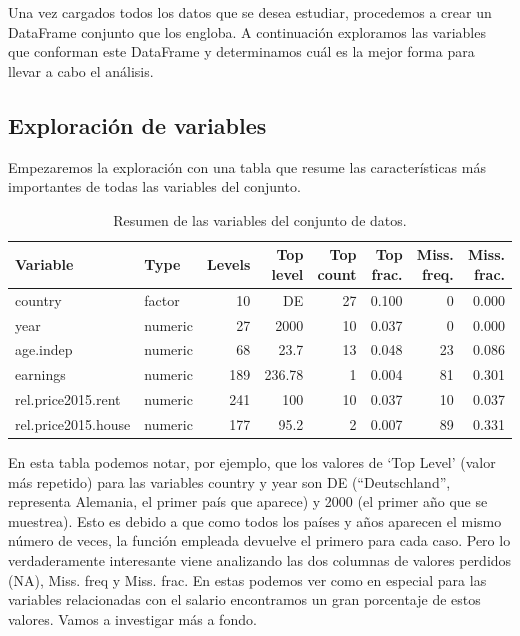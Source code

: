 \documentclass[water,article,submit,pdftex,moreauthors]{Definitions/mdpi}
\begin{document}
Una vez cargados todos los datos que se desea estudiar, procedemos a
crear un DataFrame conjunto que los engloba. A continuación exploramos
las variables que conforman este DataFrame y determinamos cuál es la
mejor forma para llevar a cabo el análisis.

\subsection{Exploración de variables}\label{exploraciuxf3n-de-variables}

Empezaremos la exploración con una tabla que resume las características
más importantes de todas las variables del conjunto.

\begin{table}[H]
\caption{Resumen de las variables del conjunto de datos.}
\centering\footnotesize\setlength{\tabcolsep}{4pt}

\begin{tabular}{llrrrrrr}
\toprule
Variable & Type & Levels & Top level & Top count & Top frac. & Miss. freq. & Miss. frac.\\
\midrule
country & factor & 10 & DE & 27 & 0.100 & 0 & 0.000\\
year & numeric & 27 & 2000 & 10 & 0.037 & 0 & 0.000\\
age.indep & numeric & 68 & 23.7 & 13 & 0.048 & 23 & 0.086\\
earnings & numeric & 189 & 236.78 & 1 & 0.004 & 81 & 0.301\\
rel.price2015.rent & numeric & 241 & 100 & 10 & 0.037 & 10 & 0.037\\
rel.price2015.house & numeric & 177 & 95.2 & 2 & 0.007 & 89 & 0.331\\
\bottomrule
\end{tabular}
\end{table}

En esta tabla podemos notar, por ejemplo, que los valores de `Top Level'
(valor más repetido) para las variables country y year son DE
(``Deutschland'', representa Alemania, el primer país que aparece) y
2000 (el primer año que se muestrea). Esto es debido a que como todos
los países y años aparecen el mismo número de veces, la función empleada
devuelve el primero para cada caso. Pero lo verdaderamente interesante
viene analizando las dos columnas de valores perdidos (NA), Miss. freq y
Miss. frac. En estas podemos ver como en especial para las variables
relacionadas con el salario encontramos un gran porcentaje de estos
valores. Vamos a investigar más a fondo.
\end{document}

